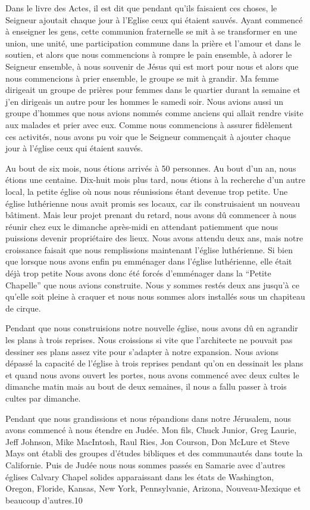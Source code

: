 Dans le livre des Actes, il est dit que pendant qu'ils faisaient ces choses, le Seigneur ajoutait chaque jour à l’Eglise
ceux qui étaient sauvés. Ayant commencé à enseigner les gens, cette communion fraternelle se mit à se transformer
en une union, une unité, une participation commune dans la prière et l’amour et dans le soutien, et alors que nous
commencions à rompre le pain ensemble, à adorer le Seigneur ensemble, à nous souvenir de Jésus qui est mort pour
nous et alors que nous commencions à prier ensemble, le groupe se mit à grandir. Ma femme dirigeait un groupe de
prières pour femmes dans le quartier durant la semaine et j’en dirigeais un autre pour les hommes le samedi soir.
Nous avions aussi un groupe d’hommes que nous avions nommés comme anciens qui allait rendre visite aux malades
et prier avec eux. Comme nous commencions à assurer fidèlement ces activités, nous avons pu voir que le Seigneur
commençait à ajouter chaque jour à l’église ceux qui étaient sauvés.

Au bout de six mois, nous étions arrivés à 50 personnes. Au bout d’un an, nous étions une centaine. Dix-huit mois
plus tard, nous étions à la recherche d’un autre local, la petite église où nous nous réunissions étant devenue trop
petite. Une église luthérienne nous avait promis ses locaux, car ils construisaient un nouveau bâtiment. Mais leur
projet prenant du retard, nous avons dû commencer à nous réunir chez eux le dimanche après-midi en attendant
patiemment que nous puissions devenir propriétaire des lieux. Nous avons attendu deux ans, mais notre croissance
faisait que nous remplissions maintenant l'église luthérienne. Si bien que lorsque nous avons enfin pu emménager
dans l'église luthérienne, elle était déjà trop petite Nous avons donc été forcés d'emménager dans la “Petite Chapelle”
que nous avions construite. Nous y sommes restés deux ans jusqu’à ce qu'elle soit pleine à craquer et nous nous
sommes alors installés sous un chapiteau de cirque.

Pendant que nous construisions notre nouvelle église, nous avons dû en agrandir les plans à trois reprises. Nous
croissions si vite que l’architecte ne pouvait pas dessiner ses plans assez vite pour s'adapter à notre expansion. Nous
avions dépassé la capacité de l’église à trois reprises pendant qu’on en dessinait les plans et quand nous avons ouvert
les portes, nous avons commencé avec deux cultes le dimanche matin mais au bout de deux semaines, il nous a fallu
passer à trois cultes par dimanche.

Pendant que nous grandissions et nous répandions dans notre Jérusalem, nous avons commencé à nous étendre en
Judée. Mon fils, Chuck Junior, Greg Laurie, Jeff Johnson, Mike MacIntosh, Raul Ries, Jon Courson, Don McLure et
Steve Mays ont établi des groupes d’études bibliques et des communautés dans toute la Californie. Puis de Judée
nous nous sommes passés en Samarie avec d’autres églises Calvary Chapel solides apparaissant dans les états de
Washington, Oregon, Floride, Kansas, New York, Pennsylvanie, Arizona, Nouveau-Mexique et beaucoup d’autres.10

